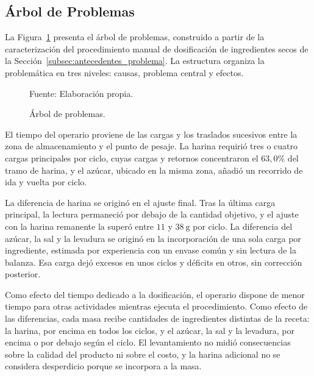 \subsection{Árbol de Problemas}
\label{subsec:arbol_problemas}

La Figura~\ref{fig:arbol_problemas} presenta el árbol de problemas,
construido a partir de la caracterización del procedimiento manual de
dosificación de ingredientes secos de la
Sección~\ref{subsec:antecedentes_problema}. La estructura organiza la
problemática en tres niveles: causas, problema central y efectos.

\begin{figure}[H]
    \centering
    \resizebox{\textwidth}{!}{%
    }
    \caption{Árbol de problemas.}
    \label{fig:arbol_problemas}
    \vspace{0.2em}
    {\footnotesize Fuente: Elaboración propia.}
\end{figure}

El tiempo del operario proviene de las cargas y los traslados sucesivos
entre la zona de almacenamiento y el punto de pesaje. La harina requirió
tres o cuatro cargas principales por ciclo, cuyas cargas y retornos
concentraron el $63{,}0\%$ del tramo de harina, y el azúcar, ubicado en la
misma zona, añadió un recorrido de ida y vuelta por ciclo.

La diferencia de harina se originó en el ajuste final. Tras la última
carga principal, la lectura permaneció por debajo de la cantidad objetivo,
y el ajuste con la harina remanente la superó entre $11$ y $38\ \mathrm{g}$
por ciclo. La diferencia del azúcar, la sal y la levadura se originó en la
incorporación de una sola carga por ingrediente, estimada por experiencia
con un envase común y sin lectura de la balanza. Esa carga dejó excesos en unos ciclos y déficits en otros, sin corrección
posterior.

Como efecto del tiempo dedicado a la dosificación, el operario dispone de
menor tiempo para otras actividades mientras ejecuta el procedimiento.
Como efecto de las diferencias, cada masa recibe cantidades de
ingredientes distintas de la receta: la harina, por encima en todos los
ciclos, y el azúcar, la sal y la levadura, por encima o por debajo según
el ciclo. El levantamiento no midió consecuencias sobre la calidad del
producto ni sobre el costo, y la harina adicional no se considera
desperdicio porque se incorpora a la masa.


